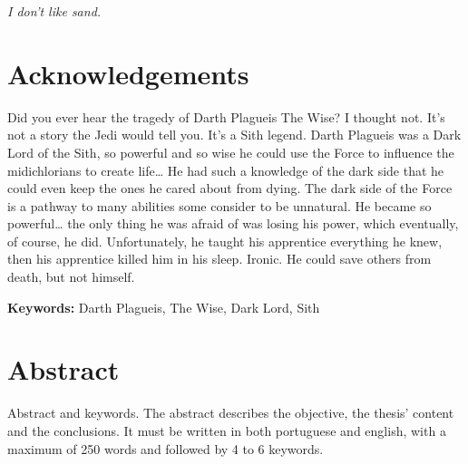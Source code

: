 \documentclass[portuguese]{ist-thesis}
\begin{document}
\makecover

\cleardoublepage

\vspace*{40mm}
{\renewcommand\baselinestretch{1.1}
\begin{flushright}\itshape
	I don't like sand.
\end{flushright}}

\cleardoublepage

\section*{Acknowledgements}

Did you ever hear the tragedy of Darth Plagueis The Wise? I thought not. It's not a story the Jedi would tell you. It's a Sith legend. Darth Plagueis was a Dark Lord of the Sith, so powerful and so wise he could use the Force to influence the midichlorians to create life… He had such a knowledge of the dark side that he could even keep the ones he cared about from dying. The dark side of the Force is a pathway to many abilities some consider to be unnatural. He became so powerful… the only thing he was afraid of was losing his power, which eventually, of course, he did. Unfortunately, he taught his apprentice everything he knew, then his apprentice killed him in his sleep. Ironic. He could save others from death, but not himself.

\vspace{\fill}
{\Large \textbf{Keywords:} Darth Plagueis, The Wise, Dark Lord, Sith}

\cleardoublepage

\section*{Abstract}

Abstract and keywords. The abstract describes the objective, the thesis' content and the conclusions. It must be written in both portuguese and english, with a maximum of 250 words and followed by 4 to 6 keywords.


\cleardoublepage

\tableofcontents
\end{document}
